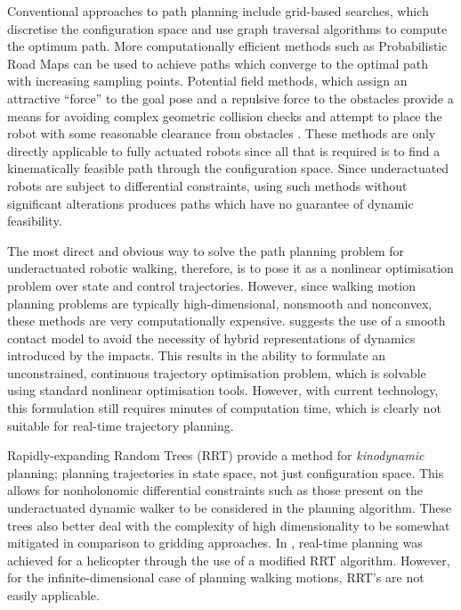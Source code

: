 Conventional approaches to path planning include grid-based searches, which discretise the configuration space and use graph traversal algorithms to compute the optimum path. More computationally efficient methods such as Probabilistic Road Maps \cite{boor1999gaussian} can be used to achieve paths which converge to the optimal path with increasing sampling points. Potential field methods, which assign an attractive ``force'' to the goal pose and a repulsive force to the obstacles provide a means for avoiding complex geometric collision checks and attempt to place the robot with some reasonable clearance from obstacles \cite{hwang1992potential}. These methods are only directly applicable to fully actuated robots since all that is required is to find a kinematically feasible path through the configuration space. Since underactuated robots are subject to differential constraints, using such methods without significant alterations produces paths which have no guarantee of dynamic feasibility. 

The most direct and obvious way to solve the path planning problem for underactuated robotic walking, therefore, is to pose it as a nonlinear optimisation problem over state and control trajectories. However, since walking motion planning problems are typically high-dimensional, nonsmooth and nonconvex, these methods are very computationally expensive. \cite{tassa2012synthesis} suggests the use of a smooth contact model to avoid the necessity of hybrid representations of dynamics introduced by the impacts. This results in the ability to formulate an unconstrained, continuous trajectory optimisation problem, which is solvable using standard nonlinear optimisation tools. However, with current technology, this formulation still requires minutes of computation time, which is clearly not suitable for real-time trajectory planning. 

Rapidly-expanding Random Trees (RRT) \cite{lavalle2001randomized} provide a method for \textit{kinodynamic} planning; planning trajectories in state space, not just configuration space. This allows for nonholonomic differential constraints such as those present on the underactuated dynamic walker to be considered in the planning algorithm. These trees also better deal with the complexity of high dimensionality to be somewhat mitigated in comparison to gridding approaches. In \cite{frazzoli2002real}, real-time planning was achieved for a helicopter through the use of a modified RRT algorithm. However, for the infinite-dimensional case of planning walking motions, RRT's are not easily applicable. %

